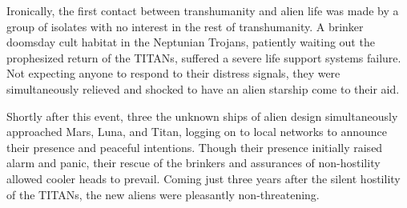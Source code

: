 Ironically, the first contact between transhumanity and alien life was made by a group of isolates with no interest in the rest of transhumanity. A brinker doomsday cult habitat in the Neptunian Trojans, patiently waiting out the prophesized return of the TITANs, suffered a severe life support systems failure. Not expecting anyone to respond to their distress signals, they were simultaneously relieved and shocked to have an alien starship come to their aid. 

Shortly after this event, three the unknown ships of alien design simultaneously approached Mars, Luna, and Titan, logging on to local networks to announce their presence and peaceful intentions. Though their presence initially raised alarm and panic, their rescue of the brinkers and assurances of non-hostility allowed cooler heads to prevail. Coming just three years after the silent hostility of the TITANs, the new aliens were pleasantly non-threatening. 

